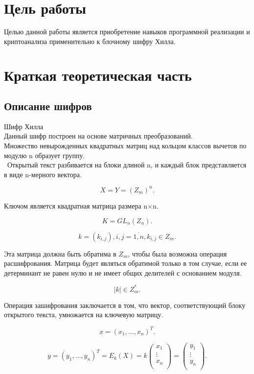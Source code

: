 \documentclass[a4paper]{article}
\begin{document}
\newpage


\tableofcontents 

\pagebreak


\section{Цель работы}

Целью данной работы является приобретение навыков программной реализации и криптоанализа применительно к блочному шифру Хилла.

\section{Краткая теоретическая часть}

\subsection{Описание шифров}

Шифр Хилла \\
Данный шифр построен на основе матричных преобразований. \\
Множество невырожденных квадратных матриц над кольцом классов вычетов по модулю n образует группу. \\\
Открытый текст разбивается на блоки длиной n, и каждый блок представляется в виде n-мерного вектора.

\[
    X=Y=(Z_m)^n.
\]

Ключом является квадратная матрица размера n$\times$n.

\[
    K=GL_n(Z_n).
\]

\[
    k=(k_{i,j}),i,j=\overline{1,n},k_{i,j} \in Z_m.
\]

Эта матрица должна быть обратима в $Z_m$, чтобы была возможна операция расшифрования. Матрица будет являться обратимой только в том случае, если ее детерминант не равен нулю и не имеет общих делителей с основанием модуля. 

\[
    |k| \in Z^*_m.
\]

Операция зашифрования заключается в том, что вектор, соответствующий блоку открытого текста, умножается на ключевую матрицу. 

\[
    x=(x_1,...,x_n)^T.
\]

\[
    y=(y_1,...,y_n)^T=E_k(X)=k
    \begin{pmatrix}
        x_1 \\
        \vdots \\
        x_n \\
    \end{pmatrix}
    =
    \begin{pmatrix}
        y_1 \\
        \vdots \\
        y_n \\
    \end{pmatrix}
    .
\]
\end{document}
